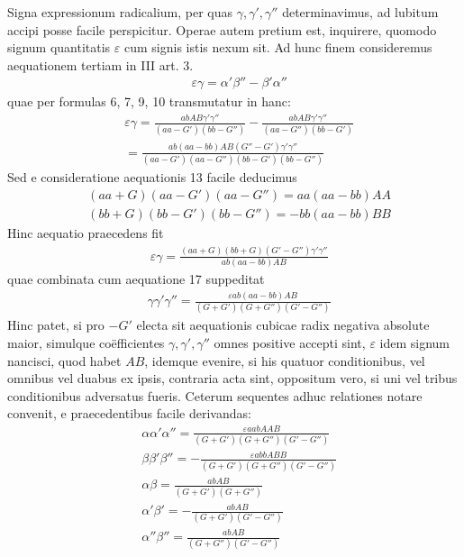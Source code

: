 Signa expressionum radicalium, per quas $\gamma,\gamma',\gamma''$ determinavimus, ad lubitum accipi posse facile perspicitur. Operae autem pretium est, inquirere, quomodo signum quantitatis $\varepsilon$ cum signis istis nexum sit. Ad hunc finem consideremus aequationem tertiam in III art. 3.
\[
\begin{aligned}
&\varepsilon\gamma=\alpha'\beta''-\beta'\alpha''
\end{aligned}
\]
quae per formulas 6, 7, 9, 10 transmutatur in hanc:
\[
\begin{aligned}
&\varepsilon\gamma=\frac{abAB\gamma'\gamma''}{(aa-G')(bb-G'')}-\frac{abAB\gamma'\gamma''}{(aa-G'')(bb-G')}\\[8pt]
&=\frac{ab(aa-bb)AB(G''-G')\gamma'\gamma''}{(aa-G')(aa-G'')(bb-G')(bb-G'')}
\end{aligned}
\]
Sed e consideratione aequationis 13 facile deducimus
\[
\begin{aligned}
&(aa+G)(aa-G')(aa-G'')=aa(aa-bb)AA\\[8pt]
&(bb+G)(bb-G')(bb-G'')=-bb(aa-bb)BB
\end{aligned}
\]
Hinc aequatio praecedens fit
\[
\begin{aligned}
&\varepsilon\gamma=\frac{(aa+G)(bb+G)(G'-G'')\gamma'\gamma''}{ab(aa-bb)AB}
\end{aligned}
\]
quae combinata cum aequatione 17 suppeditat
\[
\begin{aligned}
&\gamma\gamma'\gamma''=\frac{\varepsilon ab(aa-bb)AB}{(G+G')(G+G'')(G'-G'')}
\end{aligned}
\]
Hinc patet, si pro $-G'$ electa sit aequationis cubicae radix negativa absolute maior, simulque coëfficientes $\gamma,\gamma',\gamma''$ omnes positive accepti sint, $\varepsilon$ idem
signum nancisci, quod habet $AB$, idemque evenire, si his quatuor conditionibus, vel omnibus vel duabus ex ipsis, contraria acta sint, oppositum vero, si uni
vel tribus conditionibus adversatus fueris. Ceterum sequentes adhuc relationes
notare convenit, e praecedentibus facile derivandas:
\[
\begin{aligned}
&\alpha\alpha'\alpha''=\frac{\varepsilon aabAAB}{(G+G')(G+G'')(G'-G'')}\\[8pt]
&\beta\beta'\beta''=-\frac{\varepsilon abbABB}{(G+G')(G+G'')(G'-G'')}\\[8pt]
&\alpha\beta=\frac{abAB}{(G+G')(G+G'')}\\[8pt]
&\alpha'\beta'=-\frac{abAB}{(G+G')(G'-G'')}\\[8pt]
&\alpha''\beta''=\frac{abAB}{(G+G'')(G'-G'')}
\end{aligned}
\]

